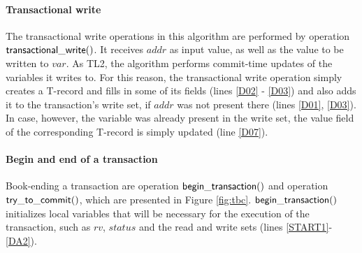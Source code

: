 \documentclass[11pt,letterpaper]{article}
\begin{document}
\paragraph{Transactional write}
The transactional write operations in this algorithm are performed by 
operation ${\sf transactional\_write()}$. 
It receives $\mathit{addr}$ as input value, as well as the value 
to be written to $\mathit{var}$. As  TL2, the algorithm 
performs commit-time updates of the variables it writes to. 
For this reason, the transactional write  
operation simply creates a T-record and fills in some of its 
fields (lines \ref{D02} - \ref{D03}) and also 
adds it to the transaction{}'s write set, 
if $\mathit{addr}$ was not present there (lines \ref{D01}, \ref{D03}). 
In case,  however,  the variable was already present in  the write set, the
{\sf value} field of the corresponding  
T-record is simply updated (line \ref{D07}).



\paragraph{Begin and end of a transaction} 
Book-ending a transaction are operation ${\sf begin\_transaction()}$ 
and operation ${\sf try\_to\_commit()}$, which are 
presented in Figure \ref{fig:tbc}. ${\sf begin\_transaction()}$ 
initializes local variables that will be necessary 
for the execution of the transaction, such as $\mathit{rv}$, 
$\mathit{status}$ and the read and write sets 
(lines \ref{START1}-\ref{DA2}). 
\end{document}
